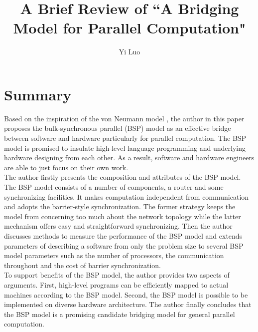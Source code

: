 \documentclass[10pt, letterpaper]{article}
\title{A Brief Review of ``A Bridging Model for Parallel Computation"}
\author{Yi Luo}
\date{} %
\begin{document}
\maketitle

\section{Summary}
\label{sec-summary}
Based on the inspiration of the von Neumann model , the author in this paper proposes the bulk-synchronous parallel (BSP) model as an effective bridge between software and hardware particularly for parallel computation. The BSP model is promised to insulate high-level language programming and underlying hardware designing from each other. As a result, software and hardware engineers are able to just focus on their own work. 
\\The author firstly presents the composition and attributes of the BSP model. The BSP model consists of a number of components, a router and some synchronizing facilities. It makes computation independent from communication and adopts the barrier-style synchronization. The former strategy keeps the model from concerning too much about the network topology while the latter mechanism offers easy and straightforward synchronizing. Then the author discusses methods to measure the performance of the BSP model and extends parameters of describing a software from only the problem size to several BSP model parameters such as the number of processors, the communication throughout and the cost of barrier synchronization.
\\To support benefits of the BSP model, the author provides two aspects of arguments. First, high-level programs can be efficiently mapped to actual machines according to the BSP model. Second, the BSP model is possible to be implemented on diverse hardware architecture. The author finally concludes that the BSP model is a promising candidate bridging model for general parallel computation.~\cite{valiant-cacm-1990}
\end{document}
